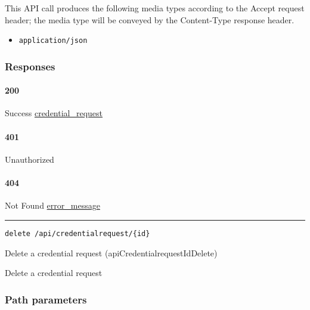 This API call produces the following media types according to the
{Accept} request header; the media type will be conveyed by the
{Content-Type} response header.

\begin{itemize}
\tightlist
\item
  \texttt{application/json}
\end{itemize}

\hypertarget{responses-68}{%
\subsubsection{Responses}\label{responses-68}}

\hypertarget{section-226}{%
\paragraph{200}\label{section-226}}

Success \protect\hyperlink{credential_request}{credential\_request}

\hypertarget{section-227}{%
\paragraph{401}\label{section-227}}

Unauthorized \protect\hyperlink{}{}

\hypertarget{section-228}{%
\paragraph{404}\label{section-228}}

Not Found \protect\hyperlink{error_message}{error\_message}

\begin{center}\rule{0.5\linewidth}{\linethickness}\end{center}

\protect\hypertarget{apiCredentialrequestIdDelete}{}{}

\begin{verbatim}
delete /api/credentialrequest/{id}
\end{verbatim}

Delete a credential request ({apiCredentialrequestIdDelete})

Delete a credential request

\hypertarget{path-parameters-34}{%
\subsubsection{Path parameters}\label{path-parameters-34}}

